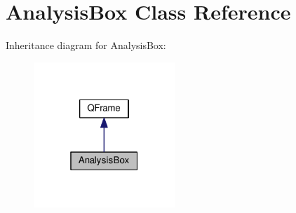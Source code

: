 \hypertarget{classGUI_1_1AnalysisBox}{}\section{Analysis\+Box Class Reference}
\label{classGUI_1_1AnalysisBox}


Inheritance diagram for Analysis\+Box\+:
\nopagebreak
\begin{figure}[H]
\begin{center}
\leavevmode
\includegraphics[width=151pt]{classGUI_1_1AnalysisBox__inherit__graph}
\end{center}
\end{figure}
